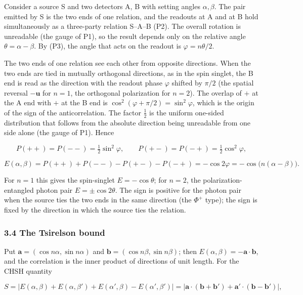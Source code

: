 \documentclass[
  a4paper,
]{article}
\begin{document}
Consider a source S and two detectors A, B with setting angles
\(\alpha,\beta\). The pair emitted by S is the two ends of one relation,
and the readouts at A and at B hold simultaneously as a three-party
relation S--A--B (P2). The overall rotation is unreadable (the gauge of
P1), so the result depends only on the relative angle
\(\theta=\alpha-\beta\). By (P3), the angle that acts on the readout is
\(\varphi=n\theta/2\).

The two ends of one relation see each other from opposite directions.
When the two ends are tied in mutually orthogonal directions, as in the
spin singlet, the B end is read as the direction with the readout phase
\(\varphi\) shifted by \(\pi/2\) (the spatial reversal
\(-\boldsymbol{u}\) for \(n=1\), the orthogonal polarization for
\(n=2\)). The overlap of \(+\) at the A end with \(+\) at the B end is
\(\cos^{2}(\varphi+\pi/2)=\sin^{2}\varphi\), which is the origin of the
sign of the anticorrelation. The factor \(\tfrac12\) is the uniform
one-sided distribution that follows from the absolute direction being
unreadable from one side alone (the gauge of P1). Hence

\[
P(++)=P(--)=\tfrac12\sin^{2}\varphi,\qquad P(+-)=P(-+)=\tfrac12\cos^{2}\varphi,
\]

\[
E(\alpha,\beta)=P(++)+P(--)-P(+-)-P(-+)=-\cos 2\varphi=-\cos\bigl(n(\alpha-\beta)\bigr).
\]

For \(n=1\) this gives the spin-singlet \(E=-\cos\theta\); for \(n=2\),
the polarization-entangled photon pair \(E=\pm\cos 2\theta\). The sign
is positive for the photon pair when the source ties the two ends in the
same direction (the \(\Phi^{+}\) type); the sign is fixed by the
direction in which the source ties the relation.

\subsubsection{3.4 The Tsirelson bound}\label{the-tsirelson-bound}

Put \(\boldsymbol{a}=(\cos n\alpha,\sin n\alpha)\) and
\(\boldsymbol{b}=(\cos n\beta,\sin n\beta)\); then
\(E(\alpha,\beta)=-\boldsymbol{a}\cdot\boldsymbol{b}\), and the
correlation is the inner product of directions of unit length. For the
CHSH quantity

\[
S=\bigl|E(\alpha,\beta)+E(\alpha,\beta')+E(\alpha',\beta)-E(\alpha',\beta')\bigr|
=\bigl|\boldsymbol{a}\cdot(\boldsymbol{b}+\boldsymbol{b}')+\boldsymbol{a}'\cdot(\boldsymbol{b}-\boldsymbol{b}')\bigr|,
\]
\end{document}
